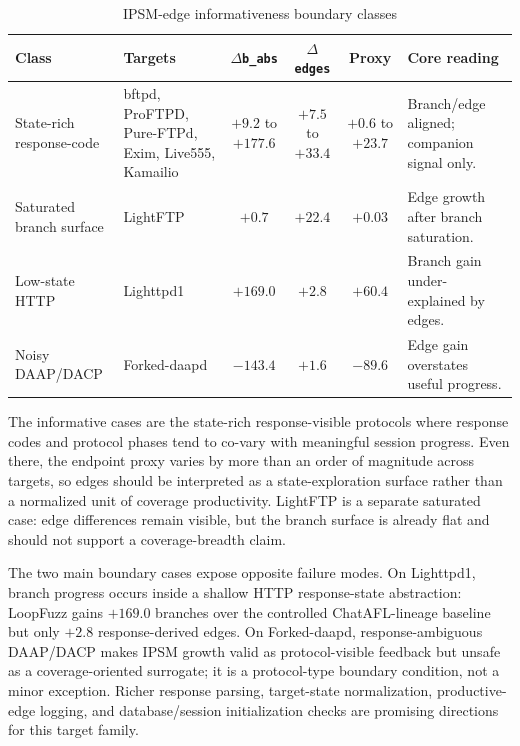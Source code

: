 \documentclass[final,5p,times,number]{elsarticle}
\begin{document}
\begin{table}[!t]
\centering
\caption{IPSM-edge informativeness boundary classes}
\label{tab:edge_productivity_boundary}
{\scriptsize
\setlength{\tabcolsep}{3.0pt}
\renewcommand{\arraystretch}{1.05}
\begin{tabularx}{\textwidth}{>{\raggedright\arraybackslash}p{}
                              >{\raggedright\arraybackslash}p{}
                              c c c X}
\toprule
Class & Targets & $\Delta$\texttt{b\_abs} & $\Delta$\texttt{edges} & Proxy & Core reading \\
\midrule
State-rich response-code & bftpd, ProFTPD, Pure-FTPd, Exim, Live555, Kamailio & $+9.2$ to $+177.6$ & $+7.5$ to $+33.4$ & $+0.6$ to $+23.7$ & Branch/edge aligned; companion signal only. \\
\midrule
Saturated branch surface & LightFTP & $+0.7$ & $+22.4$ & $+0.03$ & Edge growth after branch saturation. \\
\midrule
Low-state HTTP & Lighttpd1 & $+169.0$ & $+2.8$ & $+60.4$ & Branch gain under-explained by edges. \\
\midrule
Noisy DAAP/DACP & Forked-daapd & $-143.4$ & $+1.6$ & $-89.6$ & Edge gain overstates useful progress. \\
\bottomrule
\end{tabularx}
}
\end{table}

The informative cases are the state-rich response-visible protocols where response codes and protocol phases tend to co-vary with meaningful session progress. Even there, the endpoint proxy varies by more than an order of magnitude across targets, so edges should be interpreted as a state-exploration surface rather than a normalized unit of coverage productivity. LightFTP is a separate saturated case: edge differences remain visible, but the branch surface is already flat and should not support a coverage-breadth claim.

The two main boundary cases expose opposite failure modes. On Lighttpd1, branch progress occurs inside a shallow HTTP response-state abstraction: LoopFuzz gains $+169.0$ branches over the controlled ChatAFL-lineage baseline but only $+2.8$ response-derived edges. On Forked-daapd, response-ambiguous DAAP/DACP makes IPSM growth valid as protocol-visible feedback but unsafe as a coverage-oriented surrogate; it is a protocol-type boundary condition, not a minor exception. Richer response parsing, target-state normalization, productive-edge logging, and database/session initialization checks are promising directions for this target family.
\end{document}
